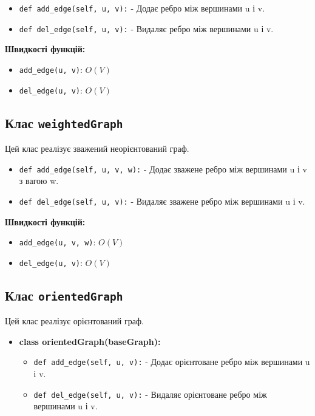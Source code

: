 \documentclass{article}
\begin{document}
\begin{itemize}
    \item \texttt{def add\_edge(self, u, v):} - Додає ребро між вершинами u і v.
    \item \texttt{def del\_edge(self, u, v):} - Видаляє ребро між вершинами u і v.
\end{itemize}


\textbf{Швидкості функцій:}
\begin{itemize}
    \item \texttt{add\_edge(u, v)}: $O(V)$
    \item \texttt{del\_edge(u, v)}: $O(V)$
\end{itemize}

\subsection{Клас \texttt{weightedGraph}}
Цей клас реалізує зважений неорієнтований граф.
\begin{itemize}
    \item \texttt{def add\_edge(self, u, v, w):} - Додає зважене ребро між вершинами u і v з вагою w.
    \item \texttt{def del\_edge(self, u, v):} - Видаляє зважене ребро між вершинами u і v.
\end{itemize}

    
\textbf{Швидкості функцій:}
\begin{itemize}
    \item \texttt{add\_edge(u, v, w)}: $O(V)$
    \item \texttt{del\_edge(u, v)}: $O(V)$
\end{itemize}

\subsection{Клас \texttt{orientedGraph}}
Цей клас реалізує орієнтований граф.

\begin{itemize}
    \item \textbf{class orientedGraph(baseGraph):}
    \begin{itemize}
        \item \texttt{def add\_edge(self, u, v):} - Додає орієнтоване ребро між вершинами u і v.
        \item \texttt{def del\_edge(self, u, v):} - Видаляє орієнтоване ребро між вершинами u і v.
    \end{itemize}
\end{itemize}
\end{document}
